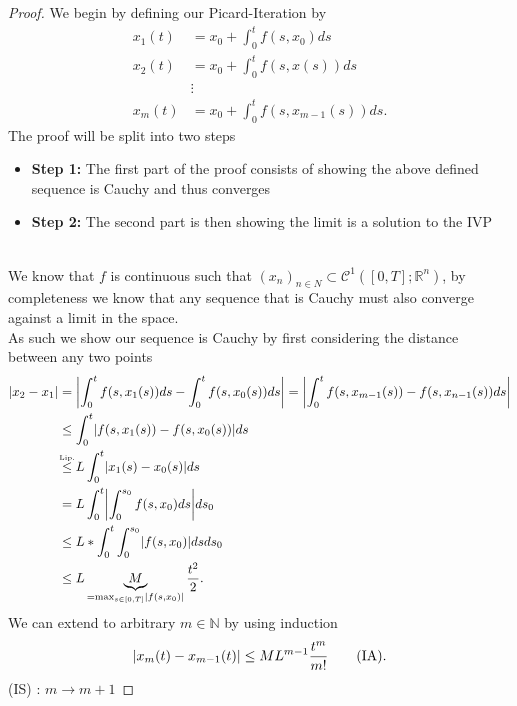\begin{proof}[Proof]
  We begin by defining our Picard-Iteration by 
  \begin{align*}
    x_1(t) &= x_0 + \int_0^{t }f(s,x_0) ds \\
    x_{2}(t) &= x_0 + \int_0^{t} f(s,x(s)) ds \\
             &\vdots \\
    x_m(t) &= x_0 + \int_0^{t} f(s,x_{m-1}(s)) ds 
  .\end{align*}
  The proof will be split into two steps 
  \begin{itemize}
   \item \textbf{Step 1:} The first part of the proof consists of showing the above defined sequence is Cauchy and thus converges
  \item \textbf{Step 2:} The second part is then showing the limit is a solution to the IVP
  \end{itemize}
  \newpage
  \hspace{0mm}\\
  We know that $f$ is continuous such that $(x_n)_{n \in  N} \subset \mathcal{C}^{1}([0,T];\mathbb{R}^{n} ) $, 
  by completeness we know that any sequence that is Cauchy must also converge against a limit in the space. \\[1ex]
  As such we show our sequence is Cauchy by first considering the distance between any two points
  \begin{align*}
    \abs{x_2 - x_1} &= \abs*{\int_{0}^{t} f(s,x_{1}(s)) ds  -  \int_{0}^{t} f(s,x_{0}(s)) ds  } = \abs*{\int_{0}^{t} f(s,x_{m-1}(s))  - f(s,x_{n-1}(s)) ds } \\
                    &\le \int_0^{t} \abs{f(s,x_{1}(s)) - f(s,x_{0}(s))} ds    \\ 
                    &\myS{Lip.}{\le }  L \int_0^{t} \abs{x_{1}(s) - x_{0}(s) } ds  \\
                    &= L \int_0^{t } \abs*{\int_0^{s_0} f(s,x_0) ds} ds_0  \\
                    &\le L * \int_0^{t} \int_0^{s_0} \abs{f(s,x_0)} ds ds_0  \\
                    &\le L \underbrace{M}_{=\max_{s \in  [0,T]}\abs{f(s,x_0)}} \frac{t^2}{2}  
  .\end{align*}
  We can extend to arbitrary $m \in  \mathbb{N}$ by using induction  
  \begin{align*}
    \lvert x_m(t) - x_{m-1}(t)\rvert \le M L^{m-1} \frac{t^m}{m!}  \tag{IA}
  .\end{align*}
  (IS) :  $m \to  m+1$

\end{proof}
